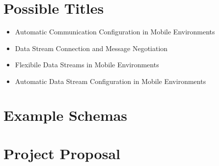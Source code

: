 \documentclass[12pt,twoside,notitlepage]{report}
\begin{document}
\begin{appendix}

\chapter{Possible Titles}

\begin{itemize}
\item Automatic Communication Configuration in Mobile Environments
\item Data Stream Connection and Message Negotiation
\item Flexibile Data Streams in Mobile Environments
\item Automatic Data Stream Configuration in Mobile Environments
\end{itemize}

\cleardoublepage

\chapter{Example Schemas}



\cleardoublepage

\chapter{Project Proposal}



\end{appendix}
\end{document}
